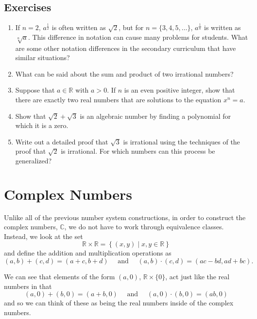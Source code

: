 \documentclass[
]{book}
\theoremstyle{definition}
\theoremstyle{definition}
\theoremstyle{definition}
\theoremstyle{remark}
\begin{document}
\hypertarget{exercises-14}{%
\subsection{Exercises}\label{exercises-14}}

\begin{enumerate}
\def\labelenumi{\arabic{enumi}.}
\item
  If \(n=2\), \(a^\frac{1}{2}\) is often written as \(\sqrt{2}\), but for \(n=\{3,4,5, \ldots\}\), \(a^{\frac{1}{n}}\) is written as \(\sqrt[n]{a}\). This difference in notation can cause many problems for students. What are some other notation differences in the secondary curriculum that have similar situations?
\item
  What can be said about the sum and product of two irrational numbers?
\item
  Suppose that \(a\in \mathbb{R}\) with \(a>0\). If \(n\) is an even positive integer, show that there are exactly two real numbers that are solutions to the equation \(x^n=a\).
\item
  Show that \(\sqrt{2}+\sqrt{3}\) is an algebraic number by finding a polynomial for which it is a zero.
\item
  Write out a detailed proof that \(\sqrt{3}\) is irrational using the techniques of the proof that \(\sqrt{2}\) is irrational. For which numbers can this process be generalized?
\end{enumerate}

\hypertarget{sec:complex}{%
\section{Complex Numbers}\label{sec:complex}}

Unlike all of the previous number system constructions, in order to construct the complex numbers, \(\mathbb{C}\), we do not have to work through equivalence classes. Instead, we look at the set
\[\mathbb{R} \times \mathbb{R} = \left\{ (x,y) \middle \vert x,y \in \mathbb{R}\right\}\] and define the addition and multiplication operations as
\[(a,b) + (c,d) = (a+c, b+d) \quad \mbox{ and } \quad (a,b) \cdot (c,d) = (ac-bd, ad+bc).\]

We can see that elements of the form \((a,0)\), \(\mathbb{R}\times \{0\}\), act just like the real numbers in that \[(a,0)+(b,0)=(a+b,0) \quad \mbox{ and } \quad (a,0)\cdot (b,0) = (ab,0)\] and so we can think of these as being the real numbers inside of the complex numbers.
\end{document}
